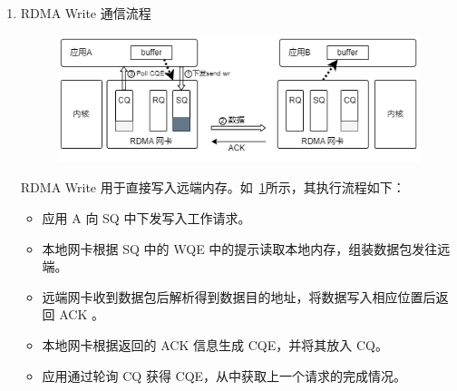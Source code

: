 {\begin{enumerate}[label=\arabic*.]
              RDMA Read 用于直接读取远端内存。如~\ref{fig:rdma-Read}所示，其执行流程如下：
              \begin{itemize}
                  \item 应用 A 向 SQ 中下发读取工作请求。
                  \item 本地网卡根据 SQ 中的 WQE 向远端发送读取请求包。
                  \item 远端网卡接收到读取请求包后，根据包中携带的信息，读取应用 B 相应位置的内存，并发回数据。
                  \item 本地网卡接收到数据，根据 WQE 的信息将数据存入应用 A 的内存，并向 CQ 中存入CQE。
                  \item 应用通过轮询 CQ 获得 CQE，从中获取上一个请求的完成情况。
              \end{itemize}

        \item RDMA Write 通信流程
              \begin{figure}[!htbp]
                  \centering
                  \includegraphics[width=\linewidth]{Img/RDMA-Write.png}
                  \label{fig:rdma-Write}
              \end{figure}

              RDMA Write 用于直接写入远端内存。如~\ref{fig:rdma-Write}所示，其执行流程如下：
              \begin{itemize}
                  \item 应用 A 向 SQ 中下发写入工作请求。
                  \item 本地网卡根据 SQ 中的 WQE 中的提示读取本地内存，组装数据包发往远端。
                  \item 远端网卡收到数据包后解析得到数据目的地址，将数据写入相应位置后返回 ACK 。
                  \item 本地网卡根据返回的 ACK 信息生成 CQE，并将其放入 CQ。
                  \item 应用通过轮询 CQ 获得 CQE，从中获取上一个请求的完成情况。
              \end{itemize}
    \end{enumerate}

}
